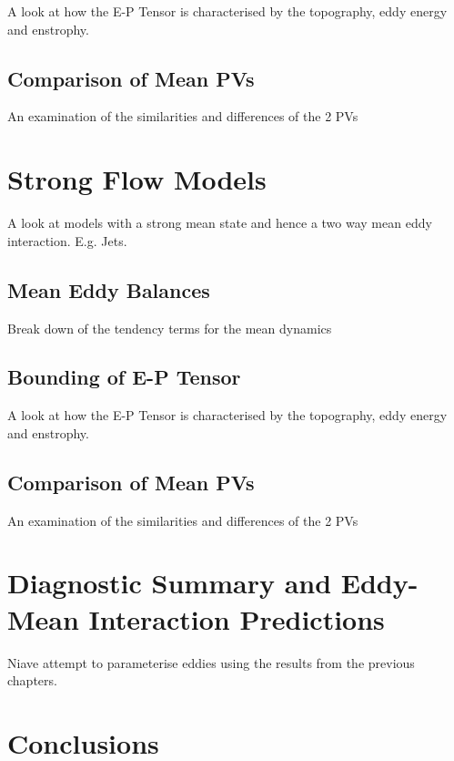 \documentclass[10pt,a4paper]{article}
\begin{document}
A look at how the E-P Tensor is characterised by
the topography, eddy energy and enstrophy.

\subsection{Comparison of Mean PVs}

An examination of the similarities and differences
of the 2 PVs

\section{Strong Flow Models}

A look at models with a strong mean state and hence
a two way mean eddy interaction. E.g. Jets.

\subsection{Mean Eddy Balances}

Break down of the tendency terms for the mean
dynamics

\subsection{Bounding of E-P Tensor}

A look at how the E-P Tensor is characterised by
the topography, eddy energy and enstrophy.

\subsection{Comparison of Mean PVs}

An examination of the similarities and differences
of the 2 PVs

\section{Diagnostic Summary and Eddy-Mean Interaction Predictions}

Niave attempt to parameterise eddies using the 
results from the previous chapters.

\section{Conclusions}
\end{document}
